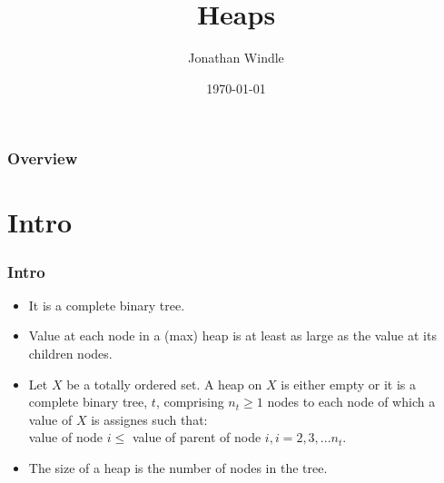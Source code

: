 \documentclass{beamer}
\title[Heaps]{Heaps} %
\author{Jonathan Windle} %
\institute[UEA] %
{
University of East Anglia \\ %
\medskip
\textit{J.Windle@uea.ac.uk} %
}
\date{\today} %
\begin{document}
\begin{frame}
\titlepage %
\end{frame}

\begin{frame}[allowframebreaks]
\frametitle{Overview} %
\tableofcontents %
\end{frame} 

\section{Intro}
\begin{frame}
\frametitle{Intro}
\begin{itemize}
\item It is a {\color{red} complete binary tree}.
\item Value at each node in a (max) heap is at least as large as the value at its children nodes.
\item Let $X$ be a totally ordered set. A heap on $X$ is either empty or it is a complete binary tree, $t$, comprising $n_t \geq 1$ nodes to each node of which a value of $X$ is assignes such that:\\
value of node $i \leq$ value of parent of node $i, i = 2,3,...n_t$.
\item The {\color{green} size} of a heap is the number of nodes in the tree.
\end{itemize}
\end{frame}

\end{document}
